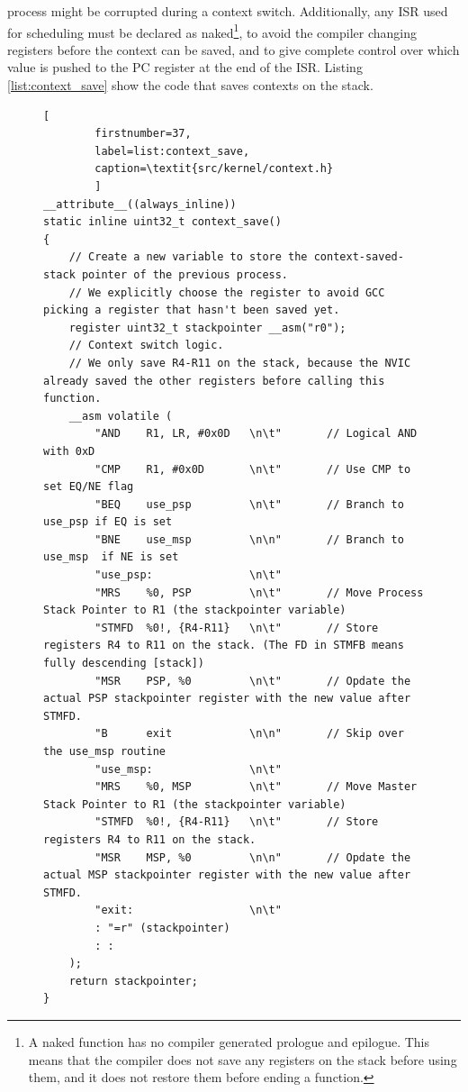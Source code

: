 process might be corrupted during a context switch. Additionally, any ISR used
for scheduling must be declared as naked\footnote{A naked function has no
compiler generated prologue and epilogue. This means that the compiler does not
save any registers on the stack before using them, and it does not restore them
before ending a function.}, to avoid the compiler changing registers before the
context can be saved, and to give complete control over which value is pushed to
the PC register at the end of the ISR. Listing \ref{list:context_save} show the
code that saves contexts on the stack.\\
\begin{figure}
\lstset{
	language=C,
	basicstyle=\footnotesize,
	showspaces=false,
	showtabs=false,
	showstringspaces=false,
	tabsize=4,
	breaklines=true
}
	\begin{lstlisting}[
		firstnumber=37,
		label=list:context_save,
		caption=\textit{src/kernel/context.h}
		]
__attribute__((always_inline))
static inline uint32_t context_save()
{
	// Create a new variable to store the context-saved-stack pointer of the previous process.
    // We explicitly choose the register to avoid GCC picking a register that hasn't been saved yet.
	register uint32_t stackpointer __asm("r0");
	// Context switch logic.
    // We only save R4-R11 on the stack, because the NVIC already saved the other registers before calling this function.
    __asm volatile (
        "AND	R1, LR, #0x0D	\n\t"		// Logical AND with 0xD
        "CMP    R1, #0x0D		\n\t"		// Use CMP to set EQ/NE flag
        "BEQ    use_psp			\n\t"		// Branch to use_psp if EQ is set
        "BNE    use_msp		 	\n\n"		// Branch to use_msp  if NE is set
        "use_psp:				\n\t"
        "MRS    %0, PSP			\n\t"		// Move Process Stack Pointer to R1 (the stackpointer variable)
        "STMFD  %0!, {R4-R11}   \n\t"		// Store registers R4 to R11 on the stack. (The FD in STMFB means fully descending [stack])
        "MSR    PSP, %0         \n\t"		// Opdate the actual PSP stackpointer register with the new value after STMFD.
        "B      exit			\n\n"		// Skip over the use_msp routine
        "use_msp:				\n\t"
        "MRS    %0, MSP			\n\t"		// Move Master Stack Pointer to R1 (the stackpointer variable)
        "STMFD  %0!, {R4-R11}   \n\t"		// Store registers R4 to R11 on the stack.
        "MSR    MSP, %0         \n\n"		// Opdate the actual MSP stackpointer register with the new value after STMFD.
        "exit:                  \n\t"
        : "=r" (stackpointer)
        : :
    );
    return stackpointer;
}
	\end{lstlisting}
\end{figure}


